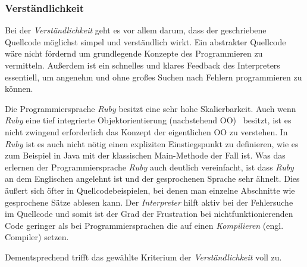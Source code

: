 \documentclass[12pt,DIV=14, version=first, BCOR=10mm,a4paper,twoside,parskip=half-,headsepline,headinclude]{scrartcl}
\begin{document}
\subsubsection{Verständlichkeit} \label{Verständlichkeit}
\begin{flushleft}
Bei der \textit{Verständlichkeit} geht es vor allem darum, dass der geschriebene Quellcode möglichst simpel und verständlich wirkt. Ein abstrakter Quellcode wäre nicht fördernd um grundlegende Konzepte des Programmieren zu vermitteln. Außerdem ist ein schnelles und klares Feedback des Interpreters essentiell, um angenehm und ohne großes Suchen nach Fehlern programmieren zu können.

Die Programmiersprache \textit{\glqq Ruby\grqq} besitzt eine sehr hohe Skalierbarkeit. Auch wenn \textit{\glqq Ruby\grqq} eine tief integrierte Objektorientierung (nachstehend \glqq OO\grqq) \, besitzt, ist es nicht zwingend erforderlich das Konzept der eigentlichen OO zu verstehen. In \textit{\glqq Ruby\grqq} ist es auch nicht nötig einen expliziten Einstiegspunkt zu definieren, wie es zum Beispiel in Java mit der klassischen Main-Methode der Fall ist. Was das erlernen der Programmiersprache \textit{\glqq Ruby\grqq} auch deutlich vereinfacht, ist dass \textit{\glqq Ruby\grqq} an dem Englischen angelehnt ist und der gesprochenen Sprache sehr ähnelt. Dies äußert sich öfter in Quellcodebeispielen, bei denen man einzelne Abschnitte wie gesprochene Sätze ablesen kann. Der \textit{Interpreter} hilft aktiv bei der Fehlersuche im Quellcode und somit ist der Grad der Frustration bei nichtfunktionierenden Code geringer als bei Programmiersprachen die auf einen \textit{Kompilieren} (engl. Compiler) setzen.

Dementsprechend trifft das gewählte Kriterium der \textit{Verständlichkeit} voll zu.
\end{flushleft}
\end{document}
